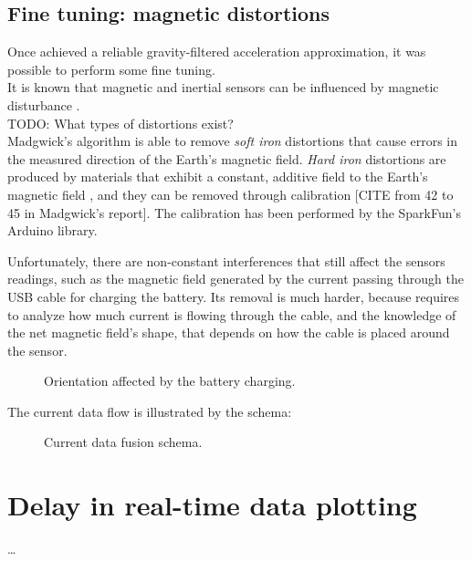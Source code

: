 \subsection{Fine tuning: magnetic distortions}
Once achieved a reliable gravity-filtered acceleration approximation, it was possible to perform some fine tuning.\\
It is known that magnetic and inertial sensors can be influenced by magnetic disturbance \cite{Fan17}.\\
TODO: What types of distortions exist?\\
Madgwick's algorithm is able to remove \textit{soft iron} distortions \cite[11-12]{Mad10} that cause errors in the measured direction of the Earth's magnetic field. \textit{Hard iron} distortions are produced by materials that exhibit a constant, additive field to the Earth's magnetic field \cite{CompensatingIron}, and they can be removed through calibration \cite{CompensatingIron, Geb06, Kok12} [CITE from 42 to 45 in Madgwick's report]. The calibration has been performed by the SparkFun's Arduino library.
\bigbreak

Unfortunately, there are non-constant interferences that still affect the sensors readings, such as the magnetic field generated by the current passing through the USB cable for charging the battery.
Its removal is much harder, because requires to analyze how much current is flowing through the cable, and the knowledge of the net magnetic field's shape, that depends on how the cable is placed around the sensor.

\begin{center}
	\begin{figure}[ht]
		\caption{Orientation affected by the battery charging.}
	\end{figure}
\end{center}

The current data flow is illustrated by the schema:

\begin{center}
	\begin{figure}[ht]
		\caption{Current data fusion schema.}
	\end{figure}
\end{center}

\section{Delay in real-time data plotting}
\dots

